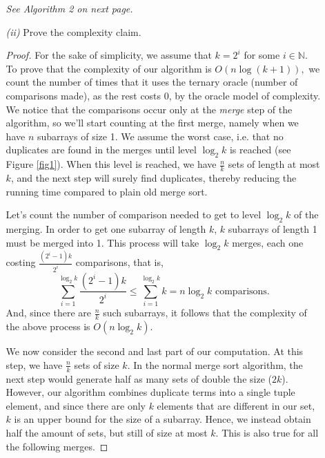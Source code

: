 \documentclass[12pt]{article}
\theoremstyle{definition}
\theoremstyle{remark}
\begin{document}
\begin{enumerate}
\begin{enumerate}
    \textit{See Algorithm 2 on next page.}
   \item[\it (ii)] Prove the complexity claim.
   \begin{proof} 
     For the sake of simplicity, we assume that $k = 2^i$ for some $i \in \mathbb{N}$. To prove that the complexity of our algorithm is $O(n \log(k+1)),$ we count the number of times that it uses the ternary oracle (number of comparisons made), as the rest costs 0, by the oracle model of complexity. We notice that the comparisons occur only at the \textit{merge} step of the algorithm, so we'll start counting at the first merge, namely when we have $n$ subarrays of size 1. We assume the worst case, i.e. that no duplicates are found in the merges until level $\log_2k$ is reached (see Figure \ref{fig1}). When this level is reached, we have $\frac{n}{k}$ sets of length at most $k$, and the next step will surely find duplicates, thereby reducing the running time compared to plain old merge sort. 
     

     \hspace{24pt} Let's count the number of comparison needed to get to level $\log_2k$ of the merging. In order to get one subarray of length $k$, $k$ subarrays of length 1 must be merged into 1. This process will take $\log_2 k$ merges, each one costing $\frac{(2^i-1)k}{2^i}$ comparisons, that is, 
     $$\sum^{\log_2 k}_{i=1} \frac{(2^i-1)k}{2^i} \leq \sum^{\log_2k}_{i=1} k = n \log_2 k \text{  comparisons.} $$
     And, since there are $\frac{n}{k}$ such subarrays, it follows that the complexity of the above process is $O(n \log_2 k).$ 
  

     \hspace{24pt} We now consider the second and last part of our computation. At this step, we have $\frac{n}{k}$ sets of size $k$. In the normal merge sort algorithm, the next step would generate half as many sets of double the size ($2k$). However, our algorithm combines duplicate terms into a single tuple element, and since there are only $k$ elements that are different in our set, $k$ is an upper bound for the size of a subarray. Hence, we instead obtain half the amount of sets, but still of size at most $k$. This is also true for all the following merges. 


\end{proof}
\end{enumerate}
\end{enumerate}
\end{document}
